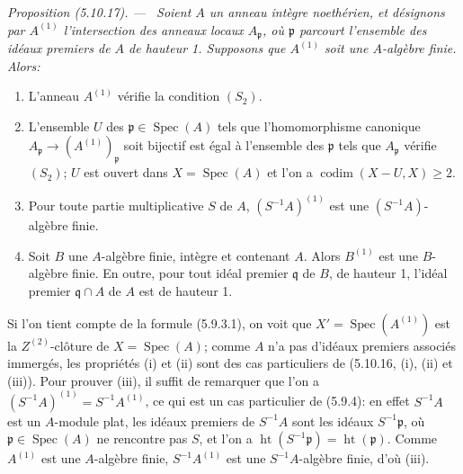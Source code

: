 \documentclass[10pt,oneside]{book}
\newenvironment{proposition}[1][]{%
  \par\medskip\noindent\itshape Proposition (#1). ---\ }{\par}
\begin{document}
\begin{proposition}[5.10.17]
\label{IV.2.s5.10.17-fr}
Soient $A$ un anneau intègre noethérien, et désignons par $A^{(1)}$
l'intersection des anneaux locaux $A_{\mathfrak p}$, où $\mathfrak p$
parcourt l'ensemble des idéaux premiers de $A$ de hauteur 1. Supposons que
$A^{(1)}$ soit une $A$-algèbre finie. Alors:
\begin{enumerate}
\item[(i)] L'anneau $A^{(1)}$ vérifie la condition $(S_2)$.
\item[(ii)] L'ensemble $U$ des $\mathfrak p\in\operatorname{Spec}(A)$ tels
que l'homomorphisme canonique
$A_{\mathfrak p}\to(A^{(1)})_{\mathfrak p}$ soit bijectif est égal à
l'ensemble des $\mathfrak p$ tels que $A_{\mathfrak p}$ vérifie $(S_2)$; $U$
est ouvert dans $X=\operatorname{Spec}(A)$ et l'on a
$\operatorname{codim}(X-U,X)\geq2$.
\item[(iii)] Pour toute partie multiplicative $S$ de $A$, $(S^{-1}A)^{(1)}$
est une $(S^{-1}A)$-algèbre finie.
\item[(iv)] Soit $B$ une $A$-algèbre finie, intègre et contenant $A$. Alors
$B^{(1)}$ est une $B$-algèbre finie. En outre, pour tout idéal premier
$\mathfrak q$ de $B$, de hauteur 1, l'idéal premier $\mathfrak q\cap A$ de
$A$ est de hauteur 1.
\end{enumerate}
\end{proposition}

Si l'on tient compte de la formule (5.9.3.1), on voit que
$X'=\operatorname{Spec}(A^{(1)})$ est la $Z^{(2)}$-clôture de
$X=\operatorname{Spec}(A)$; comme $A$ n'a pas d'idéaux premiers associés
immergés, les propriétés (i) et (ii) sont des cas particuliers de (5.10.16,
(i), (ii) et (iii)). Pour prouver (iii), il suffit de remarquer que l'on a
$(S^{-1}A)^{(1)}=S^{-1}A^{(1)}$, ce qui est un cas particulier de (5.9.4): en
effet $S^{-1}A$ est un $A$-module plat, les idéaux premiers de $S^{-1}A$ sont
les idéaux $S^{-1}\mathfrak p$, où $\mathfrak p\in\operatorname{Spec}(A)$ ne
rencontre pas $S$, et l'on a
$\operatorname{ht}(S^{-1}\mathfrak p)=\operatorname{ht}(\mathfrak p)$. Comme
$A^{(1)}$ est une $A$-algèbre finie, $S^{-1}A^{(1)}$ est une
$S^{-1}A$-algèbre finie, d'où (iii).
\end{document}
